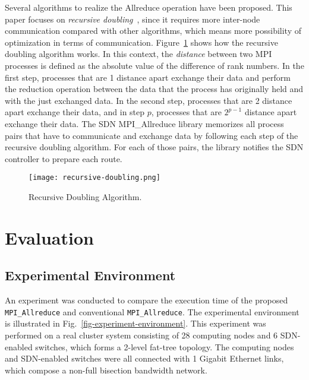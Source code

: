 Several algorithms to realize the Allreduce operation have been
proposed. This paper focuses on \emph{recursive doubling}~\cite{Thakur2005},
since it requires more inter-node communication compared with other
algorithms, which means more possibility of optimization in terms of
communication. Figure~\ref{fig-recursive-doubling} shows how the recursive
doubling algorithm works. In this context, the \emph{distance} between two MPI
processes is defined as the absolute value of the difference of rank numbers.
In the first step, processes that are 1 distance apart exchange their data and
perform the reduction operation between the data that the process has
originally held and with the just exchanged data. In the second step,
processes that are 2 distance apart exchange their data, and in step \(p\),
processes that are \(2^{p - 1}\) distance apart exchange their data. The SDN
MPI\_Allreduce library memorizes all process pairs that have to communicate
and exchange data by following each step of the recursive doubling algorithm.
For each of those pairs, the library notifies the SDN controller to prepare
each route.

\begin{figure}[htbp]
    \begin{center}
        \texttt{[image: recursive-doubling.png]}
    \end{center}
    \caption{Recursive Doubling Algorithm.}%
    \label{fig-recursive-doubling}
\end{figure}

\hypertarget{evaluation}{%
\section{Evaluation}\label{evaluation}}

\hypertarget{experimental-environment}{%
\subsection{Experimental Environment}\label{experimental-environment}}

An experiment was conducted to compare the execution time of the
proposed \texttt{MPI\_Allreduce} and conventional
\texttt{MPI\_Allreduce}. The experimental environment is illustrated in
Fig.~\ref{fig-experiment-environment}. This experiment was performed on
a real cluster system consisting of 28 computing nodes and 6 SDN-enabled
switches, which forms a 2-level fat-tree topology. The computing nodes
and SDN-enabled switches were all connected with 1 Gigabit Ethernet
links, which compose a non-full bisection bandwidth network.

